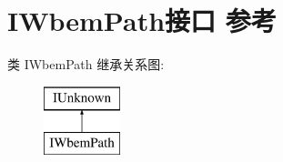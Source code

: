 \hypertarget{interface_i_wbem_path}{}\section{I\+Wbem\+Path接口 参考}
\label{interface_i_wbem_path}
类 I\+Wbem\+Path 继承关系图\+:\begin{figure}[H]
\begin{center}
\leavevmode
\includegraphics[height=2.000000cm]{interface_i_wbem_path}
\end{center}
\end{figure}
